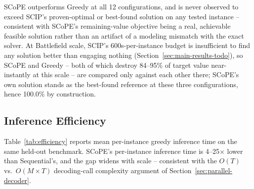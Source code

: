 \documentclass[smallcondensed]{svjour3}
\begin{document}
SCoPE outperforms Greedy at all 12 configurations, and is never observed to exceed SCIP's proven-optimal or best-found solution on any tested instance -- consistent with SCoPE's remaining-value objective being a real, achievable feasible solution rather than an artifact of a modeling mismatch with the exact solver. At Battlefield scale, SCIP's 600s-per-instance budget is insufficient to find any solution better than engaging nothing (Section~\ref{sec:main-results-todo}), so SCoPE and Greedy -- both of which destroy 84--95\% of target value near-instantly at this scale -- are compared only against each other there; SCoPE's own solution stands as the best-found reference at these three configurations, hence 100.0\% by construction.
\label{sec:main-results-todo}

\subsection{Inference Efficiency}
\label{sec:efficiency}

Table~\ref{tab:efficiency} reports mean per-instance greedy inference time on the same held-out benchmark. SCoPE's per-instance inference time is 4--25$\times$ lower than Sequential's, and the gap widens with scale -- consistent with the $O(T)$ vs.\ $O(M{\times}T)$ decoding-call complexity argument of Section~\ref{sec:parallel-decoder}.
\end{document}

